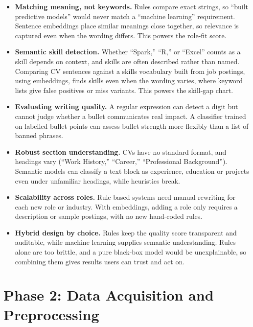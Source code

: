 \documentclass[11pt,a4paper]{article}
\begin{document}
\begin{itemize}
  \item \textbf{Matching meaning, not keywords.} Rules compare exact
  strings, so ``built predictive models'' would never match a ``machine
  learning'' requirement. Sentence embeddings place similar meanings
  close together, so relevance is captured even when the wording
  differs. This powers the role-fit score.
  \item \textbf{Semantic skill detection.} Whether ``Spark,'' ``R,'' or
  ``Excel'' counts as a skill depends on context, and skills are often
  described rather than named. Comparing CV sentences against a skills
  vocabulary built from job postings, using embeddings, finds skills
  even when the wording varies, where keyword lists give false positives
  or miss variants. This powers the skill-gap chart.
  \item \textbf{Evaluating writing quality.} A regular expression can
  detect a digit but cannot judge whether a bullet communicates real
  impact. A classifier trained on labelled bullet points can assess
  bullet strength more flexibly than a list of banned phrases.
  \item \textbf{Robust section understanding.} CVs have no standard
  format, and headings vary (``Work History,'' ``Career,''
  ``Professional Background''). Semantic models can classify a text
  block as experience, education or projects even under unfamiliar
  headings, while heuristics break.
  \item \textbf{Scalability across roles.} Rule-based systems need
  manual rewriting for each new role or industry. With embeddings,
  adding a role only requires a description or sample postings, with no
  new hand-coded rules.
  \item \textbf{Hybrid design by choice.} Rules keep the quality score
  transparent and auditable, while machine learning supplies semantic
  understanding. Rules alone are too brittle, and a pure black-box model
  would be unexplainable, so combining them gives results users can
  trust and act on.
\end{itemize}

\FloatBarrier
\section{Phase 2: Data Acquisition and Preprocessing}

\end{document}
